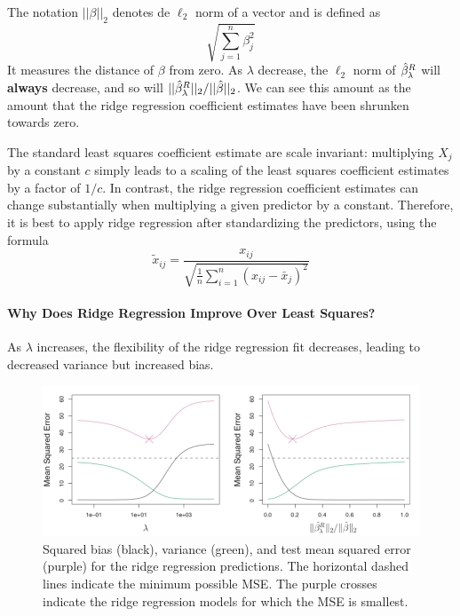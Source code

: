 The notation $||\beta||_2$ denotes de $\ell_2$ norm of a vector and is defined as
\[ \sqrt{\sum_{j=1}^n \beta_j^2} \]
It measures the distance of $\beta$ from zero. As $\lambda$ decrease, the $\ell_2$ norm of $\hat{\beta}_\lambda^R$ will \textbf{always} decrease, and so will $||\hat{\beta}_\lambda^R||_2/||\hat{\beta}||_2$. We can see this amount as the amount that the ridge regression coefficient estimates have been shrunken towards zero.
\begin{note}
    \label{note:StandardizedCoefficient}
The standard least squares coefficient estimate are scale invariant: multiplying $X_j$ by a constant $c$ simply leads to a scaling of the least squares coefficient estimates by a factor of $1/c$. In contrast, the ridge regression coefficient estimates can change substantially when multiplying a given predictor by a constant. Therefore, it is best to apply ridge regression after standardizing the predictors, using the formula
    \[ \tilde{x}_{i j}=\frac{x_{i j}}{\sqrt{\frac{1}{n} \sum_{i=1}^{n}\left(x_{i j}-\bar{x}_{j}\right)^{2}}} \]
\end{note}

\paragraph{Why Does Ridge Regression Improve Over Least Squares?}
As $\lambda$ increases, the flexibility of the ridge regression fit decreases, leading to decreased variance but increased bias.

\begin{figure}
    \centering
    \includegraphics[scale=0.45]{src/StatisticalLearning/Ridge-TradeOff-VarianceBias.png}
    \caption{Squared bias (black), variance (green), and test mean squared error (purple) for the ridge regression predictions. The horizontal dashed lines indicate the minimum possible MSE. The purple crosses indicate the ridge regression models for which the MSE is smallest.}
\end{figure}

